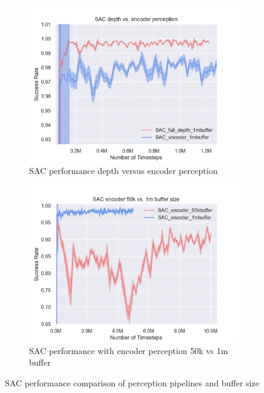 \begin{figure}[!htbp]
    \begin{subfigure}{0.49\textwidth}
        \includegraphics[width=\linewidth]{figures/SACfull/SAC_depth_vs_encoder_perception.png}
        \caption{SAC performance depth versus encoder perception} \label{fig:percep}
    \end{subfigure}%
    \hspace*{\fill}   %
    \begin{subfigure}{0.49\textwidth}
        \includegraphics[width=\linewidth]{figures/SACfull/SAC_encoder_50k_vs_1m_buffer_size}
        \caption{SAC performance with encoder perception 50k vs 1m buffer} \label{fig:encbuffer}
    \end{subfigure}%
    \hspace*{\fill}   %


\caption{ SAC performance comparison of perception pipelines and buffer size\label{fig:sacperf}}
\end{figure}

